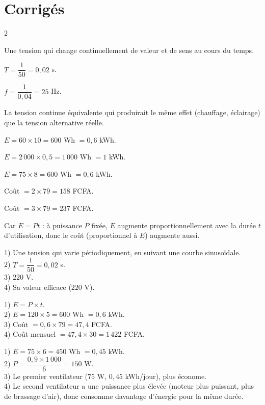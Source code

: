 \section{Corrigés}
\begin{multicols}{2}

Une tension qui change continuellement de valeur et de sens au cours du temps.

$T=\dfrac1{50}=0{,}02$ s.

$f=\dfrac1{0{,}04}=25$ Hz.

La tension continue équivalente qui produirait le même effet (chauffage, éclairage) que
la tension alternative réelle.

$E=60\times10=600$ Wh $=0{,}6$ kWh.

$E=2\,000\times0{,}5=1\,000$ Wh $=1$ kWh.

$E=75\times8=600$ Wh $=0{,}6$ kWh.

Coût $=2\times79=158$ FCFA.

Coût $=3\times79=237$ FCFA.

Car $E=Pt$ : à puissance $P$ fixée, $E$ augmente proportionnellement avec la durée $t$
d'utilisation, donc le coût (proportionnel à $E$) augmente aussi.

1) Une tension qui varie périodiquement, en suivant une courbe sinusoïdale.\\
2) $T=\dfrac1{50}=0{,}02$ s.\\
3) $220$ V.\\
4) Sa valeur efficace ($220$ V).

1) $E=P\times t$.\\
2) $E=120\times5=600$ Wh $=0{,}6$ kWh.\\
3) Coût $=0{,}6\times79=47{,}4$ FCFA.\\
4) Coût mensuel $=47{,}4\times30=1\,422$ FCFA.

1) $E=75\times6=450$ Wh $=0{,}45$ kWh.\\
2) $P=\dfrac{0{,}9\times1\,000}6=150$ W.\\
3) Le premier ventilateur ($75$ W, $0{,}45$ kWh/jour), plus économe.\\
4) Le second ventilateur a une puissance plus élevée (moteur plus puissant, plus de
brassage d'air), donc consomme davantage d'énergie pour la même durée.

\end{multicols}
\exercicesBanner
